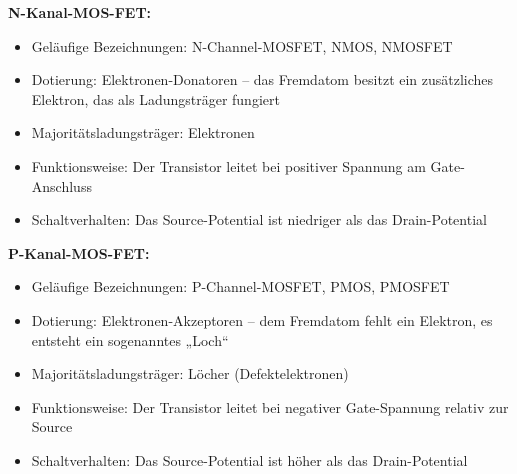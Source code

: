 \textbf{N-Kanal-MOS-FET:}
\begin{itemize}
	\item Geläufige Bezeichnungen: N-Channel-MOSFET, NMOS, NMOSFET
	\item Dotierung: Elektronen-Donatoren – das Fremdatom besitzt ein zusätzliches Elektron, das als Ladungsträger fungiert
	\item Majoritätsladungsträger: Elektronen
	\item Funktionsweise: Der Transistor leitet bei positiver Spannung am Gate-Anschluss
	\item Schaltverhalten: Das Source-Potential ist niedriger als das Drain-Potential
\end{itemize}
\textbf{P-Kanal-MOS-FET:}
\begin{itemize}
	\item Geläufige Bezeichnungen: P-Channel-MOSFET, PMOS, PMOSFET
	\item Dotierung: Elektronen-Akzeptoren – dem Fremdatom fehlt ein Elektron, es entsteht ein sogenanntes „Loch“
	\item Majoritätsladungsträger: Löcher (Defektelektronen)
	\item Funktionsweise: Der Transistor leitet bei negativer Gate-Spannung relativ zur Source
	\item Schaltverhalten: Das Source-Potential ist höher als das Drain-Potential
\end{itemize}
